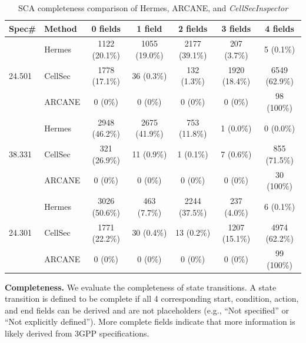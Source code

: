 \documentclass[sigconf]{acmart}
\newcommand{\lm}{\textit{CellSecInspector}\xspace}
\begin{document}
{\begin{table}[t]
\centering
\caption{
SCA completeness comparison of Hermes, ARCANE, and \lm
}
\vspace{-0.1in}
\label{tab:sca_completeness}
\scriptsize
\setlength{\tabcolsep}{2.2pt}
\begin{tabular}{p{0.5cm}lccccc}
\toprule
\textbf{Spec\#} & \textbf{Method} & \textbf{0 fields} & \textbf{1 field} & \textbf{2 fields} & \textbf{3 fields} & \textbf{4 fields} \\
\midrule

\multirow{3}{*}{24.501}
 & Hermes  & 1122 (20.1\%) & 1055 (19.0\%) & 2177 (39.1\%) & 207 (3.7\%) & 5 (0.1\%)   \\
 & CellSec & 1778 (17.1\%) & 36 (0.3\%)    & 132 (1.3\%)  & 1920 (18.4\%) & 6549 (62.9\%) \\
 & ARCANE  & 0 (0\%) & 0 (0\%) & 0 (0\%) & 0 (0\%) & 98 (100\%) \\

\midrule

\multirow{3}{*}{38.331}
 & Hermes  & 2948 (46.2\%) & 2675 (41.9\%) & 753 (11.8\%) & 1 (0.0\%) & 0 (0.0\%)   \\
 & CellSec & 321 (26.9\%)  & 11 (0.9\%)    & 1 (0.1\%)   & 7 (0.6\%) & 855 (71.5\%) \\
 & ARCANE  & 0 (0\%) & 0 (0\%) & 0 (0\%) & 0 (0\%) & 30 (100\%) \\

\midrule

\multirow{3}{*}{24.301}
 & Hermes  & 3026  (50.6\%) & 463 (7.7\%)   & 2244 (37.5\%) & 237 (4.0\%) & 6 (0.1\%)   \\
 & CellSec & 1771 (22.2\%) & 30 (0.4\%)    & 13 (0.2\%)   & 1207 (15.1\%) & 4974 (62.2\%) \\
 & ARCANE  & 0 (0\%) & 0 (0\%) & 0 (0\%) & 0 (0\%) & 99 (100\%) \\

\bottomrule
\end{tabular}
\vspace{-0.15in}
\end{table}



\noindent \textbf{Completeness.} We evaluate the completeness of state transitions. A state transition is defined to be complete if all 4 corresponding start, condition, action, and end fields can be derived and are not placeholders (e.g., ``Not specified'' or ``Not explicitly defined''). More complete fields indicate that more information is likely derived from 3GPP specifications. 

}
\end{document}
